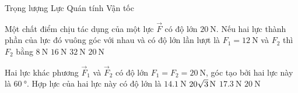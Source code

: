 \begin{ex}
	\choice
	{Trọng lượng}
	{Lực}
	{\True Quán tính}
	{Vận tốc}
	\loigiai{}
\end{ex}
\begin{ex}
Một chất điểm chịu tác dụng của một lực $\vec{F}$ có độ lớn $\SI{20}{\newton}$. Nếu hai lực thành phần của lực đó vuông góc với nhau	và có độ lớn lần lượt là $F_1=\SI{12}{\newton}$ và $F_2$ thì $F_2$ bằng
	\choice
	{\True $\SI{8}{\newton}$}
	{$\SI{16}{\newton}$}
	{$\SI{32}{\newton}$}
	{$\SI{20}{\newton}$}
	\loigiai{}
\end{ex}
\begin{ex}
Hai lực khác phương $\vec{F}_1$ và $\vec{F}_2$ có độ lớn $F_1=F_2=\SI{20}{\newton}$, góc tạo bởi hai lực này là $\SI{60}{\degree}$. Hợp lực của hai lực này có độ lớn là	
	\choice
	{$\SI{14.1}{\newton}$}
	{\True $\xsi{20\sqrt{3}}{\newton}$}
	{$\SI{17.3}{\newton}$}
	{$\SI{20}{\newton}$}
	\loigiai{}
\end{ex}
